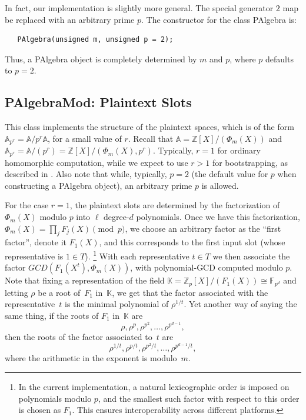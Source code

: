 \documentclass[14pt]{extarticle}
\newcommand{\A}{\mathbb{A}}
\newcommand{\F}{\mathbb{F}}
\newcommand{\K}{\mathbb{K}}
\newcommand{\Z}{\mathbb{Z}}
\def\PAlgebra{\textsf{PAlgebra}}
\def\PAlgebraMod{\textsf{PAlgebraMod}}
\begin{document}
In fact, our implementation is slightly more general.
The special generator $2$ map be replaced with an arbitrary prime $p$.
The constructor for the class {\PAlgebra} is:
\begin{verbatim}
   PAlgebra(unsigned m, unsigned p = 2); 
\end{verbatim}
Thus, a {\PAlgebra} object is completely determined by $m$ and $p$,
where $p$ defaults to $p = 2$.



\subsection{{\PAlgebraMod}: Plaintext Slots}
\label{sec:PAlgebraTwo}\label{sec:PAlgebraTwoR}
This class implements the structure of the plaintext spaces,
which is of the form $\A_{p^r} = \A/p^r \A$,
for a small value of $r$.
Recall that $\A = \Z[X]/(\Phi_m(X))$
and $\A_{p^r} = \A/(p^r) = \Z[X]/(\Phi_m(X), p^r)$.
Typically, $r = 1$ for ordinary homomorphic computation,
while we expect to use $r > 1$ for bootstrapping,
as described in
\cite{GHS12b}. 
Also note that while, typically, $p=2$ (the default value for $p$
when constructing a {\PAlgebra} object), an arbitrary prime $p$
is allowed.


For the case $r=1$, the plaintext slots are determined by the
factorization of $\Phi_m(X)$ modulo $p$ into $\ell$ degree-$d$
polynomials. 
Once we have this factorization, $\Phi_m(X)=\prod_j
F_j(X)\pmod{p}$, we choose an arbitrary factor as the ``first factor'',
denote it $F_1(X)$, and this corresponds to the first input slot
(whose representative is $1\in T$).%
\footnote{
In the current implementation, a natural lexicographic order
is imposed on polynomials modulo $p$, and the smallest
such factor with respect to this order is chosen as $F_1$.
This ensures interoperability across different platforms.
}
With each representative $t\in T$
we then associate the factor $GCD(F_1(X^t),\Phi_m(X))$, with
polynomial-GCD computed modulo $p$. 
Note that fixing a representation of the field $\K=\Z_p[X]/(F_1(X))
\cong \F_{p^d}$ and letting $\rho$ be a root of~$F_1$ in~$\K$, we get
that the factor associated with the representative~$t$ is the minimal
polynomial of $\rho^{1/t}$. Yet another way of saying the same thing,
if the roots of $F_1$ in~$\K$ are \[\rho,\rho^p,\rho^{p^2},\ldots,
\rho^{p^{d-1}},\] then the roots of the factor associated to~$t$ are
\[\rho^{1/t},\rho^{p/t},\rho^{p^2/t},\ldots,\rho^{p^{d-1}/t},\] where
the arithmetic in the exponent is modulo~$m$.
\end{document}

